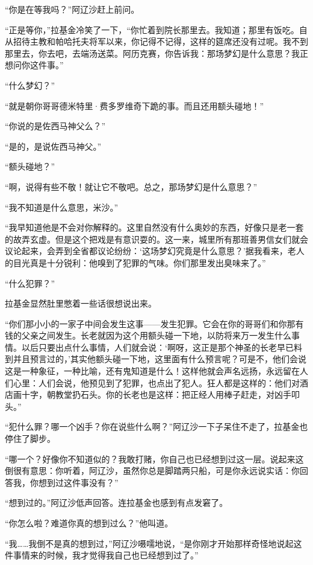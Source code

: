\par “你是在等我吗？”阿辽沙赶上前问。
\par “正是等你，”拉基金冷笑了一下，“你忙着到院长那里去。我知道；那里有饭吃。自从招待主教和帕哈托夫将军以来，你记得不记得，这样的筵席还没有过呢。我不到那里去，你去吧，去端汤送菜。阿历克赛，你告诉我：那场梦幻是什么意思？我正想问你这件事。”
\par “什么梦幻？”
\par “就是朝你哥哥德米特里·费多罗维奇下跪的事。而且还用额头碰地！”
\par “你说的是佐西马神父么？”
\par “是的，是说佐西马神父。”
\par “额头碰地？”
\par “啊，说得有些不敬！就让它不敬吧。总之，那场梦幻是什么意思？”
\par “我不知道是什么意思，米沙。”
\par “我早知道他是不会对你解释的。这里自然没有什么奥妙的东西，好像只是老一套的故弄玄虚。但是这个把戏是有意识耍的。这一来，城里所有那班善男信女们就会议论起来，会弄到全省都议论纷纷：‘这场梦幻究竟是什么意思？’据我看来，老人的目光真是十分锐利：他嗅到了犯罪的气味。你们那里发出臭味来了。”
\par “什么犯罪？”
\par 拉基金显然肚里憋着一些话很想说出来。
\par “你们那小小的一家子中间会发生这事——发生犯罪。它会在你的哥哥们和你那有钱的父亲之间发生。长老就因为这个用额头碰一下地，以防将来万一发生什么事情。以后只要出点什么事情，人们就会说：‘啊呀，这正是那个神圣的长老早已料到并且预言过的，’其实他额头碰一下地，这里面有什么预言呢？可是不，他们会说这是一种象征，一种比喻，还有鬼知道是什么！这样他就会声名远扬，永远留在人们心里：人们会说，他预见到了犯罪，也点出了犯人。狂人都是这样的：他们对酒店画十字，朝教堂扔石头。你的长老也是这样：把正经人用棒子赶走，对凶手叩头。”
\par “犯什么罪？哪一个凶手？你在说些什么啊？”阿辽沙一下子呆住不走了，拉基金也停住了脚步。
\par “哪一个？好像你不知道似的？我敢打赌，你自己也已经想到过这一层。说起来这倒很有意思：你听着，阿辽沙，虽然你总是脚踏两只船，可是你永远说实话：你回答我，你想到过这件事没有？”
\par “想到过的。”阿辽沙低声回答。连拉基金也感到有点发窘了。
\par “你怎么啦？难道你真的想到过么？”他叫道。
\par “我……我倒不是真的想到过，”阿辽沙嗫嚅地说，“是你刚才开始那样奇怪地说起这件事情来的时候，我才觉得我自己也已经想到过了。”
